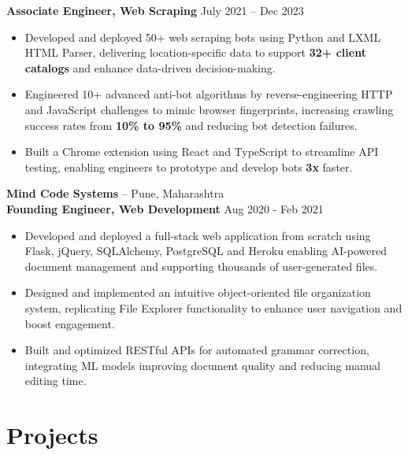\documentclass[11pt]{article}       %
\begin{document}
\textbf{Associate Engineer, Web Scraping} \hfill July 2021 -- Dec 2023 \\

\begin{itemize}
  \item Developed and deployed 50+ web scraping bots using Python and LXML HTML Parser, delivering location-specific data to support \textbf{32+ client catalogs} and enhance data-driven decision-making. \\
  \item Engineered 10+ advanced anti-bot algorithms by reverse-engineering HTTP and JavaScript challenges to mimic browser fingerprints, increasing crawling success rates from \textbf{10\% to 95\%} and reducing bot detection failures. \\
  \item Built a Chrome extension using React and TypeScript to streamline API testing, enabling engineers to prototype and develop bots \textbf{3x} faster. \\
\end{itemize}

\textbf{Mind Code Systems} -- Pune, Maharashtra \\

\textbf{Founding Engineer, Web Development} \hfill Aug 2020 - Feb 2021 \\

\begin{itemize}
  \item Developed and deployed a full-stack web application from scratch using Flask, jQuery, SQLAlchemy, PostgreSQL and Heroku enabling AI-powered document management and supporting thousands of user-generated files. \\
  \item Designed and implemented an intuitive object-oriented file organization system, replicating File Explorer functionality to enhance user navigation and boost engagement. \\
  \item Built and optimized RESTful APIs for automated grammar correction, integrating ML models improving document quality and reducing manual editing time. \\
\end{itemize}

\section*{Projects}
\end{document}
